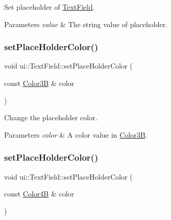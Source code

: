 Set placeholder of \hyperlink{classui_1_1TextField}{Text\+Field}. 


\begin{DoxyParams}{Parameters}
{\em value} & The string value of placeholder. \\
\hline
\end{DoxyParams}
\mbox{\label{classui_1_1TextField_a64bf3054d1aa45eeea0dd3b01b953c50}} 
\subsubsection{\texorpdfstring{set\+Place\+Holder\+Color()}{setPlaceHolderColor()}\hspace{0.1cm}{\footnotesize\ttfamily [1/4]}}
{\footnotesize\ttfamily void ui\+::\+Text\+Field\+::set\+Place\+Holder\+Color (\begin{DoxyParamCaption}\item[{const \hyperlink{structColor3B}{Color3B} \&}]{color }\end{DoxyParamCaption})}



Change the placeholder color. 


\begin{DoxyParams}{Parameters}
{\em color} & A color value in {\ttfamily \hyperlink{structColor3B}{Color3B}}. \\
\hline
\end{DoxyParams}
\mbox{\label{classui_1_1TextField_acfd23c7de3ad8725aedac1f770230283}} 
\subsubsection{\texorpdfstring{set\+Place\+Holder\+Color()}{setPlaceHolderColor()}\hspace{0.1cm}{\footnotesize\ttfamily [2/4]}}
{\footnotesize\ttfamily void ui\+::\+Text\+Field\+::set\+Place\+Holder\+Color (\begin{DoxyParamCaption}\item[{const \hyperlink{structColor4B}{Color4B} \&}]{color }\end{DoxyParamCaption})}



